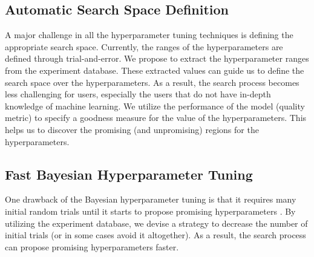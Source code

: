 \subsection{Automatic Search Space Definition}\label{sub-section-automatic-search-definition}
A major challenge in all the hyperparameter tuning techniques is defining the appropriate search space.
Currently, the ranges of the hyperparameters are defined through trial-and-error.
We propose to extract the hyperparameter ranges from the experiment database.
These extracted values can guide us to define the search space over the hyperparameters.
As a result, the search process becomes less challenging for users, especially the users that do not have in-depth knowledge of machine learning.
We utilize the performance of the model (quality metric) to specify a goodness measure for the value of the hyperparameters.
This helps us to discover the promising (and unpromising) regions for the hyperparameters.


\subsection{Fast Bayesian Hyperparameter Tuning}
One drawback of the Bayesian hyperparameter tuning is that it requires many initial random trials until it starts to propose promising hyperparameters \cite{hutter2011sequential,snoek2012practical}.
By utilizing the experiment database, we devise a strategy to decrease the number of initial trials (or in some cases avoid it altogether).
As a result, the search process can propose promising hyperparameters faster.

